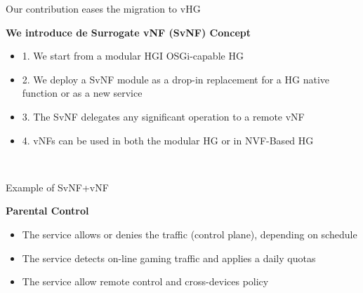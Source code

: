 \documentclass[a4paper]{beamer}
\begin{document}
\begin{frame}{Our contribution eases the migration to vHG}
	
	\begin{flushleft}	
		\textbf{We introduce de Surrogate vNF (SvNF) Concept}
		\begin{itemize}
			\item 1. We start from a modular HGI OSGi-capable HG
			\item 2. We deploy a SvNF module as a drop-in replacement for a HG native function or as a new service
			\item 3. The SvNF delegates any significant operation to a remote vNF
			\item 4. vNFs can be used in both the modular HG or in NVF-Based HG
		\end{itemize}
	\end{flushleft}
	\centering
	\\
			
\end{frame}

\begin{frame}{Example of SvNF+vNF}
	\begin{flushleft}	
		\textbf{Parental Control}
		\begin{itemize}
			\item The service allows or denies the traffic (control plane), depending on schedule
			\item The service detects on-line gaming traffic and applies a daily quotas
			\item The service allow remote control and cross-devices policy
		\end{itemize}
	\end{flushleft}
	\vspace{2em}
	\centering
	\\
			
\end{frame}
\end{document}
